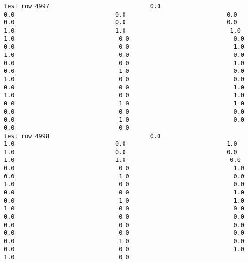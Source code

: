 \documentclass[11pt]{article}
\begin{document}
\begin{verbatim}
test row 4997                             0.0                             0.0                             0.0                             0.0                             0.0                             0.0                             0.0                             1.0                             1.0                              1.0                              1.0                              0.0                              0.0                              0.0                              0.0                              1.0                              1.0                              0.0                              0.0                              0.0                              0.0                              1.0                              0.0                              1.0                              0.0                              1.0                              0.0                              0.0                              0.0                              0.0                              1.0                              1.0                              0.0                              1.0                              0.0                              1.0                              1.0                              0.0                              0.0                              0.0                              0.0                              1.0                              0.0                              0.0                              0.0
test row 4998                             0.0                             1.0                             0.0                             1.0                             1.0                             0.0                             0.0                             1.0                             1.0                              0.0                              0.0                              0.0                              1.0                              0.0                              1.0                              0.0                              1.0                              0.0                              0.0                              0.0                              0.0                              1.0                              0.0                              1.0                              1.0                              1.0                              0.0                              0.0                              0.0                              0.0                              0.0                              0.0                              0.0                              0.0                              0.0                              0.0                              0.0                              0.0                              1.0                              0.0                              0.0                              0.0                              1.0                              1.0                              0.0

\end{verbatim}
\end{document}
